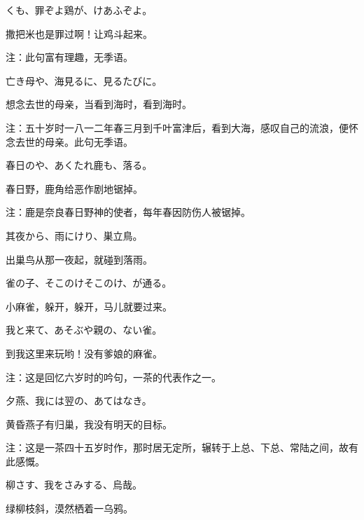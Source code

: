 \begin{haiku}
    {\FH {}くも、罪ぞよ鶏が、けあふぞよ。}

    {\FK 撒把米也是罪过啊！让鸡斗起来。}

    {\FT 注：此句富有理趣，无季语。}
\end{haiku}

\begin{haiku}
    {\FH 亡き母や、海見るに、見るたびに。}

    {\FK 想念去世的母亲，当看到海时，看到海时。}

    {\FT 注：五十岁时一八一二年春三月到千叶富津后，看到大海，感叹自己的流浪，便怀念去世的母亲。此句无季语。}
\end{haiku}

\begin{haiku}
    {\FH 春日のや、あくたれ鹿も、落る。}

    {\FK 春日野，鹿角给恶作剧地锯掉。}

    {\FT 注：鹿是奈良春日野神的使者，每年春因防伤人被锯掉。}
\end{haiku}

\begin{haiku}
    {\FH 其夜から、雨にけり、巣立鳥。}

    {\FK 出巢鸟从那一夜起，就碰到落雨。}
\end{haiku}

\begin{haiku}
    {\FH 雀の子、そこのけそこのけ、が通る。}

    {\FK 小麻雀，躲开，躲开，马儿就要过来。}
\end{haiku}

\begin{haiku}
    {\FH 我と来て、あそぶや親の、ない雀。}

    {\FK 到我这里来玩哟！没有爹娘的麻雀。}

    {\FT 注：这是回忆六岁时的吟句，一茶的代表作之一。}
\end{haiku}

\begin{haiku}
    {\FH 夕燕、我には翌の、あてはなき。}

    {\FK 黄昏燕子有归巢，我没有明天的目标。}

    {\FT 注：这是一茶四十五岁时作，那时居无定所，辗转于上总、下总、常陆之间，故有此感慨。}
\end{haiku}

\begin{haiku}
    {\FH 柳さす、我をさみする、烏哉。}

    {\FK 绿柳枝斜，漠然栖着一乌鸦。}
\end{haiku}

